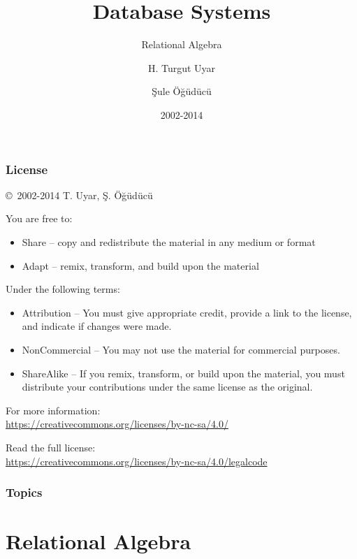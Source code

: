 \documentclass[dvipsnames]{beamer}
\title{Database Systems}
\subtitle{Relational Algebra}
\author{H. Turgut Uyar \and Şule Öğüdücü}
\date{2002-2014}
\theoremstyle{plain}
\begin{document}
\begin{frame}
  \titlepage
\end{frame}

\begin{frame}
  \frametitle{License}

  \hfill
  \copyright~2002-2014 T. Uyar, Ş. Öğüdücü

  \vfill
  \begin{footnotesize}
    You are free to:
    \begin{itemize}
      \itemsep0em
      \item Share -- copy and redistribute the material in any medium or format
      \item Adapt -- remix, transform, and build upon the material
    \end{itemize}

    Under the following terms:
    \begin{itemize}
      \itemsep0em
      \item Attribution -- You must give appropriate credit, provide a link to
        the license, and indicate if changes were made.

      \item NonCommercial -- You may not use the material for commercial
        purposes.

      \item ShareAlike -- If you remix, transform, or build upon the material,
        you must distribute your contributions under the same license as the
        original.
    \end{itemize}
  \end{footnotesize}

  \begin{small}
    For more information:\\
    \url{https://creativecommons.org/licenses/by-nc-sa/4.0/}

    \smallskip
    Read the full license:\\
    \url{https://creativecommons.org/licenses/by-nc-sa/4.0/legalcode}
  \end{small}
\end{frame}

\begin{frame}
  \frametitle{Topics}
  \tableofcontents
\end{frame}

\lstset{language=TutorialD}

\section{Relational Algebra}
\end{document}
